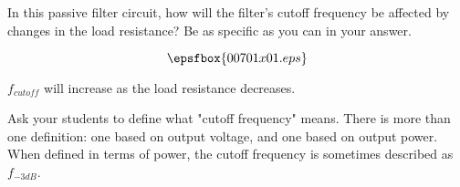 

In this passive filter circuit, how will the filter's cutoff frequency be affected by changes in the load resistance?  Be as specific as you can in your answer.

$$\epsfbox{00701x01.eps}$$







$f_{cutoff}$ will increase as the load resistance decreases.







Ask your students to define what "cutoff frequency" means.  There is more than one definition: one based on output voltage, and one based on output power.  When defined in terms of power, the cutoff frequency is sometimes described as $f_{-3 dB}$.




